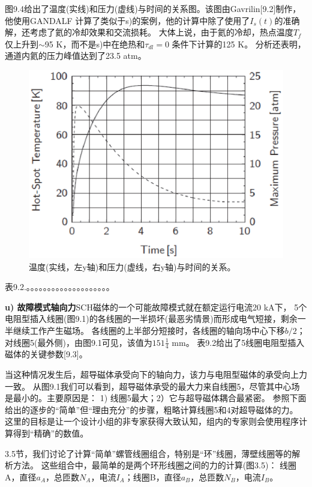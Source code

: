 图9.4给出了温度(实线)和压力(虚线)与时间的关系图。该图由Gavrilin[9.2]制作，他使用GANDALF
计算了类似于s)的案例，他的计算中除了使用了$I_s(t)$的准确解，还考虑了氦的冷却效果和交流损耗。
大体上说，由于氦的冷却，热点温度$T_f$仅上升到$\sim$95 K，而不是s)中在绝热和$\tau_{dl}=0$
条件下计算的125 K。
分析还表明，通道内氦的压力峰值达到了23.5 atm。
\begin{figure}[htbp]
	\centering
	\includegraphics[scale=0.6]{chpt9/figs/fig9.4.eps}
	\caption{温度(实线，左y轴)和压力(虚线，右y轴)与时间的关系。}
\end{figure}

表9.2.。。。。。。。。。。。。。。。。。。。。


\textbf{u) 故障模式轴向力}\qquad SCH磁体的一个可能故障模式就在额定运行电流20 kA下，
5个电阻型插入线圈(图9.1)的各线圈的一半损坏(最恶劣情景)而形成电气短接，剩余一半继续工作产生磁场。
各线圈的上半部分短接时，各线圈的轴向场中心下移$b/2$；
对线圈5(最外侧)，由图9.1可见，该值为$151\frac{1}{4}$ mm。
表9.2给出了5线圈电阻型插入磁体的关键参数[9.3]。

当这种情况发生后，超导磁体承受向下的轴向力，该力与电阻型磁体的承受向上力一致。
从图9.1我们可以看到，超导磁体承受的最大力来自线圈5，尽管其中心场是最小的。主要原因是：
1) 线圈5最大；2）它与超导磁体耦合最紧密。
参照下面给出的逐步的“简单”但“理由充分”的步骤，粗略计算线圈5和4对超导磁体的力。
这里的目标是让一个设计小组的非专家获得大致认知，组内的专家则会使用程序计算得到“精确”的数值。

3.5节，我们讨论了计算“简单”螺管线圈组合，特别是“环”线圈，薄壁线圈等的解析方法。
这些组合中，最简单的是两个环形线圈之间的力的计算(图3.5)：
线圈A，直径$a_A$，总匝数$N_A$，电流$I_A$；线圈B，直径$a_B$，总匝数$N_B$，电流$I_B$。

